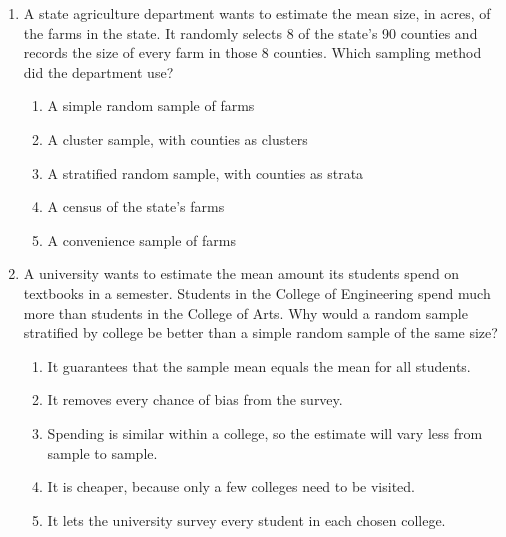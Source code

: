 \documentclass[12pt]{article}
\begin{document}
\begin{enumerate}[leftmargin=1.9em, itemsep=0.10in]

  \item A state agriculture department wants to estimate the mean size, in acres, of the farms
        in the state. It randomly selects 8 of the state's 90 counties and records the size of
        every farm in those 8 counties. Which sampling method did the department use?
        \begin{enumerate}[label=\textbf{(\Alph*)}, leftmargin=2.2em, itemsep=1pt]
          \item A simple random sample of farms
          \item A cluster sample, with counties as clusters
          \item A stratified random sample, with counties as strata
          \item A census of the state's farms
          \item A convenience sample of farms
                \hfill{}\rule[-0.2in]{0pt}{0.48in}
        \end{enumerate}

  \item A university wants to estimate the mean amount its students spend on textbooks in a
        semester. Students in the College of Engineering spend much more than students in the
        College of Arts. Why would a random sample stratified by college be better than a simple
        random sample of the same size?
        \begin{enumerate}[label=\textbf{(\Alph*)}, leftmargin=2.2em, itemsep=1pt]
          \item It guarantees that the sample mean equals the mean for all students.
          \item It removes every chance of bias from the survey.
          \item Spending is similar within a college, so the estimate will vary less from
                sample to sample.
          \item It is cheaper, because only a few colleges need to be visited.
          \item It lets the university survey every student in each chosen college.
                \hfill{}\rule[-0.2in]{0pt}{0.48in}
        \end{enumerate}

\end{enumerate}
\end{document}
